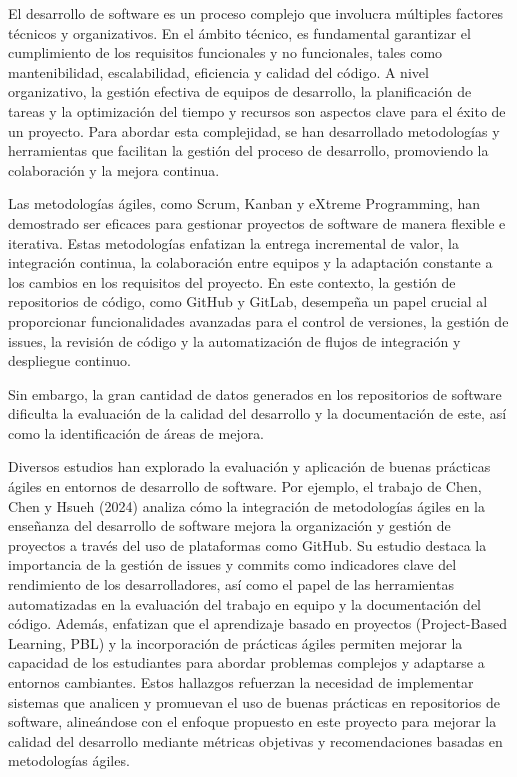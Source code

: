 
El desarrollo de software es un proceso complejo que involucra múltiples factores técnicos y organizativos. En el ámbito técnico, es fundamental garantizar el cumplimiento de los requisitos funcionales y no funcionales, tales como mantenibilidad, escalabilidad, eficiencia y calidad del código\cite{isoiec25000}. A nivel organizativo, la gestión efectiva de equipos de desarrollo, la planificación de tareas y la optimización del tiempo y recursos son aspectos clave para el éxito de un proyecto. Para abordar esta complejidad, se han desarrollado metodologías y herramientas que facilitan la gestión del proceso de desarrollo, promoviendo la colaboración y la mejora continua.

Las metodologías ágiles, como Scrum\cite{sutherland2014scrum}, Kanban\cite{roe2017kanban} y eXtreme Programming\cite{beck2004extreme}, han demostrado ser eficaces para gestionar proyectos de software de manera flexible e iterativa. Estas metodologías enfatizan la entrega incremental de valor, la integración continua, la colaboración entre equipos y la adaptación constante a los cambios en los requisitos del proyecto. En este contexto, la gestión de repositorios de código, como GitHub y GitLab, desempeña un papel crucial al proporcionar funcionalidades avanzadas para el control de versiones, la gestión de issues, la revisión de código y la automatización de flujos de integración y despliegue continuo.

Sin embargo, la gran cantidad de datos generados en los repositorios de software dificulta la evaluación de la calidad del desarrollo y la documentación de este, así como la identificación de áreas de mejora. 

Diversos estudios han explorado la evaluación y aplicación de buenas prácticas ágiles en entornos de desarrollo de software. Por ejemplo, el trabajo de Chen, Chen y Hsueh (2024)\cite{Chen2024} analiza cómo la integración de metodologías ágiles en la enseñanza del desarrollo de software mejora la organización y gestión de proyectos a través del uso de plataformas como GitHub. Su estudio destaca la importancia de la gestión de issues y commits como indicadores clave del rendimiento de los desarrolladores, así como el papel de las herramientas automatizadas en la evaluación del trabajo en equipo y la documentación del código. Además, enfatizan que el aprendizaje basado en proyectos (Project-Based Learning, PBL) y la incorporación de prácticas ágiles permiten mejorar la capacidad de los estudiantes para abordar problemas complejos y adaptarse a entornos cambiantes. Estos hallazgos refuerzan la necesidad de implementar sistemas que analicen y promuevan el uso de buenas prácticas en repositorios de software, alineándose con el enfoque propuesto en este proyecto para mejorar la calidad del desarrollo mediante métricas objetivas y recomendaciones basadas en metodologías ágiles.

